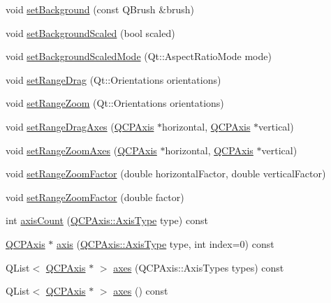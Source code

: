 \begin{DoxyCompactItemize}
\item 
void \hyperlink{class_q_c_p_axis_rect_a22a22b8668735438dc06f9a55fe46b33}{set\+Background} (const Q\+Brush \&brush)
\item 
void \hyperlink{class_q_c_p_axis_rect_ae6d36c3e0e968ffb991170a018e7b503}{set\+Background\+Scaled} (bool scaled)
\item 
void \hyperlink{class_q_c_p_axis_rect_a5ef77ea829c9de7ba248e473f48f7305}{set\+Background\+Scaled\+Mode} (Qt\+::\+Aspect\+Ratio\+Mode mode)
\item 
void \hyperlink{class_q_c_p_axis_rect_ae6aef2f7211ba6097c925dcd26008418}{set\+Range\+Drag} (Qt\+::\+Orientations orientations)
\item 
void \hyperlink{class_q_c_p_axis_rect_a7960a9d222f1c31d558b064b60f86a31}{set\+Range\+Zoom} (Qt\+::\+Orientations orientations)
\item 
void \hyperlink{class_q_c_p_axis_rect_a648cce336bd99daac4a5ca3e5743775d}{set\+Range\+Drag\+Axes} (\hyperlink{class_q_c_p_axis}{Q\+C\+P\+Axis} $\ast$horizontal, \hyperlink{class_q_c_p_axis}{Q\+C\+P\+Axis} $\ast$vertical)
\item 
void \hyperlink{class_q_c_p_axis_rect_a9442cca2aa358405f39a64d51eca13d2}{set\+Range\+Zoom\+Axes} (\hyperlink{class_q_c_p_axis}{Q\+C\+P\+Axis} $\ast$horizontal, \hyperlink{class_q_c_p_axis}{Q\+C\+P\+Axis} $\ast$vertical)
\item 
void \hyperlink{class_q_c_p_axis_rect_a895d7ac745ea614e04056244b3c138ac}{set\+Range\+Zoom\+Factor} (double horizontal\+Factor, double vertical\+Factor)
\item 
void \hyperlink{class_q_c_p_axis_rect_ae83d187b03fc6fa4f00765ad50cd3fc3}{set\+Range\+Zoom\+Factor} (double factor)
\item 
int \hyperlink{class_q_c_p_axis_rect_a85b321acec0f694d8b5fdeafdbff3133}{axis\+Count} (\hyperlink{class_q_c_p_axis_ae2bcc1728b382f10f064612b368bc18a}{Q\+C\+P\+Axis\+::\+Axis\+Type} type) const
\item 
\hyperlink{class_q_c_p_axis}{Q\+C\+P\+Axis} $\ast$ \hyperlink{class_q_c_p_axis_rect_a583ae4f6d78b601b732183f6cabecbe1}{axis} (\hyperlink{class_q_c_p_axis_ae2bcc1728b382f10f064612b368bc18a}{Q\+C\+P\+Axis\+::\+Axis\+Type} type, int index=0) const
\item 
Q\+List$<$ \hyperlink{class_q_c_p_axis}{Q\+C\+P\+Axis} $\ast$ $>$ \hyperlink{class_q_c_p_axis_rect_a8db4722cb93e9c4a6f0d91150c200867}{axes} (Q\+C\+P\+Axis\+::\+Axis\+Types types) const
\item 
Q\+List$<$ \hyperlink{class_q_c_p_axis}{Q\+C\+P\+Axis} $\ast$ $>$ \hyperlink{class_q_c_p_axis_rect_a11657b8faebe9677180860e8057ede26}{axes} () const

\end{DoxyCompactItemize}
